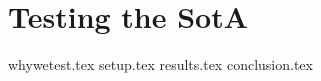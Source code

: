 \chapter{Testing the SotA}\label{sec:sota_test}
{whywetest.tex}
{setup.tex}
{results.tex}
{conclusion.tex}
